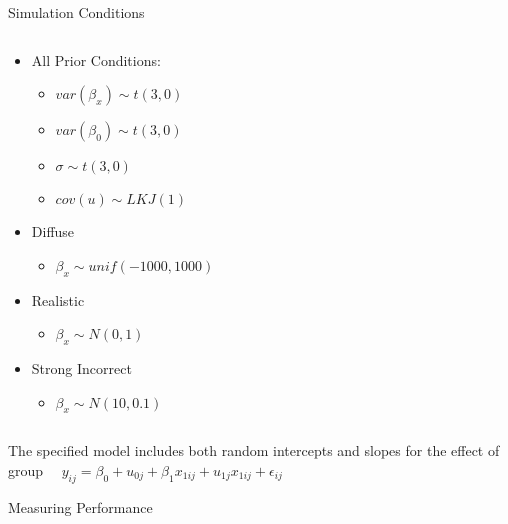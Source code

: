 \documentclass[final,hyperref={pdfpagelabels=false}]{beamer}
\begin{document}
\begin{frame}[t]
\begin{columns}[t]
\begin{column}{.465\textwidth}
\begin{block}{Simulation Conditions}
\begin{columns}
	\begin{column}{.48\textwidth} %
\begin{itemize}
	\item All Prior Conditions:
	\begin{itemize}
	\item	$var(\beta_{x}) \sim t(3,0)$
    \item	$var(\beta_{0}) \sim t(3,0)$
    \item	$\sigma \sim t(3,0)$
    \item   $cov(u) \sim LKJ(1)$
	\end{itemize}
	\item Diffuse
		\begin{itemize}
			\item  $\beta_{x} \sim unif(-1000,1000)$
		\end{itemize}
			\item Realistic
			\begin{itemize}
				\item  $\beta_{x} \sim N(0,1)$
			\end{itemize}
						\item Strong Incorrect
						\begin{itemize}
							\item  $\beta_{x} \sim N(10,0.1)$
						\end{itemize}
\end{itemize}
	\end{column}
\end{columns} %
\small{The specified model includes both random intercepts and slopes for the effect of group  $\quad y_{ij} = \beta_{0} + u_{0j} + \beta_{1}x_{1ij}  +u_{1j}x_{1ij} + \epsilon_{ij}$}

\end{block}


\begin{block}{Measuring Performance}
		
				\begin{columns} %
					\begin{column}{.32\textwidth} %


\end{column}
\end{columns}
\end{block}
\end{column}
\end{columns}
\end{frame}
\end{document}

